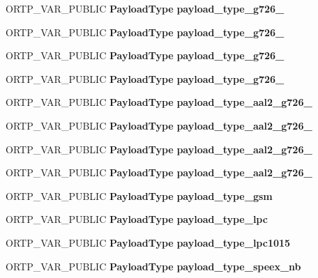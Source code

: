 \begin{DoxyCompactItemize}
O\+R\+T\+P\+\_\+\+V\+A\+R\+\_\+\+P\+U\+B\+L\+IC \textbf{ Payload\+Type} {\bfseries payload\+\_\+type\+\_\+g726\+\_}
\item 
\mbox{\label{payloadtype_8h_a97bb505af0a5e2fc5cccacd2ac0400e5}} 
O\+R\+T\+P\+\_\+\+V\+A\+R\+\_\+\+P\+U\+B\+L\+IC \textbf{ Payload\+Type} {\bfseries payload\+\_\+type\+\_\+g726\+\_}
\item 
\mbox{\label{payloadtype_8h_aebb13443e4ddf9a01e8026fcd5a7dbf2}} 
O\+R\+T\+P\+\_\+\+V\+A\+R\+\_\+\+P\+U\+B\+L\+IC \textbf{ Payload\+Type} {\bfseries payload\+\_\+type\+\_\+g726\+\_}
\item 
\mbox{\label{payloadtype_8h_ac4343db917b53d48126c6fd2dc233e8a}} 
O\+R\+T\+P\+\_\+\+V\+A\+R\+\_\+\+P\+U\+B\+L\+IC \textbf{ Payload\+Type} {\bfseries payload\+\_\+type\+\_\+g726\+\_}
\item 
\mbox{\label{payloadtype_8h_adc3495cfa6358b952f9d226a27ba2db2}} 
O\+R\+T\+P\+\_\+\+V\+A\+R\+\_\+\+P\+U\+B\+L\+IC \textbf{ Payload\+Type} {\bfseries payload\+\_\+type\+\_\+aal2\+\_\+g726\+\_}
\item 
\mbox{\label{payloadtype_8h_a93879c270fbcc45690bca38a306c6ab6}} 
O\+R\+T\+P\+\_\+\+V\+A\+R\+\_\+\+P\+U\+B\+L\+IC \textbf{ Payload\+Type} {\bfseries payload\+\_\+type\+\_\+aal2\+\_\+g726\+\_}
\item 
\mbox{\label{payloadtype_8h_a73a27968d1bd4596eda9b8f6d40f9dfd}} 
O\+R\+T\+P\+\_\+\+V\+A\+R\+\_\+\+P\+U\+B\+L\+IC \textbf{ Payload\+Type} {\bfseries payload\+\_\+type\+\_\+aal2\+\_\+g726\+\_}
\item 
\mbox{\label{payloadtype_8h_a0ab2ad8f4a1d289c7adaf6875ff00491}} 
O\+R\+T\+P\+\_\+\+V\+A\+R\+\_\+\+P\+U\+B\+L\+IC \textbf{ Payload\+Type} {\bfseries payload\+\_\+type\+\_\+aal2\+\_\+g726\+\_}
\item 
\mbox{\label{payloadtype_8h_a24eb78569c704676f30dc92cc28ef4d2}} 
O\+R\+T\+P\+\_\+\+V\+A\+R\+\_\+\+P\+U\+B\+L\+IC \textbf{ Payload\+Type} {\bfseries payload\+\_\+type\+\_\+gsm}
\item 
\mbox{\label{payloadtype_8h_abde667d94c9bc32e78e45794c2c2c383}} 
O\+R\+T\+P\+\_\+\+V\+A\+R\+\_\+\+P\+U\+B\+L\+IC \textbf{ Payload\+Type} {\bfseries payload\+\_\+type\+\_\+lpc}
\item 
\mbox{\label{payloadtype_8h_a377137be224cbb168edf8ddf856425c4}} 
O\+R\+T\+P\+\_\+\+V\+A\+R\+\_\+\+P\+U\+B\+L\+IC \textbf{ Payload\+Type} {\bfseries payload\+\_\+type\+\_\+lpc1015}
\item 
\mbox{\label{payloadtype_8h_a19d98d5469a2bca32e7ec519494de7f2}} 
O\+R\+T\+P\+\_\+\+V\+A\+R\+\_\+\+P\+U\+B\+L\+IC \textbf{ Payload\+Type} {\bfseries payload\+\_\+type\+\_\+speex\+\_\+nb}

\end{DoxyCompactItemize}
